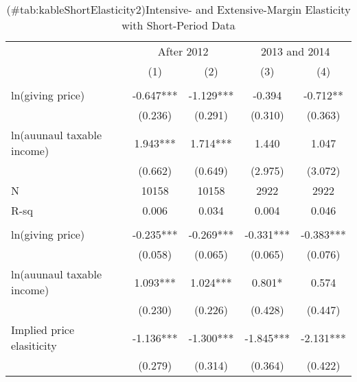 \documentclass[
]{article}
\begin{document}
\begin{table}

\caption{(\#tab:kableShortElasticity2)Intensive- and Extensive-Margin Elasticity with Short-Period Data}
\centering
\fontsize{7}{9}\selectfont
\begin{threeparttable}
\begin{tabular}[t]{lcccc}
\toprule
\multicolumn{1}{c}{ } & \multicolumn{2}{c}{After 2012} & \multicolumn{2}{c}{2013 and 2014} \\
\cmidrule(l{3pt}r{3pt}){2-3} \cmidrule(l{3pt}r{3pt}){4-5}
 & (1) & (2) & (3) & (4)\\
\midrule
\addlinespace[0.3em]
\multicolumn{5}{l}{\textbf{Intensive-Margin Elasticity}}\\
\hspace{1em}ln(giving price) & -0.647*** & -1.129*** & -0.394 & -0.712**\\
\hspace{1em} & (0.236) & (0.291) & (0.310) & (0.363)\\
\hspace{1em}ln(auunaul taxable income) & 1.943*** & 1.714*** & 1.440 & 1.047\\
\hspace{1em} & (0.662) & (0.649) & (2.975) & (3.072)\\
\hspace{1em}N & 10158 & 10158 & 2922 & 2922\\
\hspace{1em}R-sq & 0.006 & 0.034 & 0.004 & 0.046\\
\addlinespace[0.3em]
\multicolumn{5}{l}{\textbf{Extensive-Margin Elasticity}}\\
\hspace{1em}ln(giving price) & -0.235*** & -0.269*** & -0.331*** & -0.383***\\
\hspace{1em} & (0.058) & (0.065) & (0.065) & (0.076)\\
\hspace{1em}ln(auunaul taxable income) & 1.093*** & 1.024*** & 0.801* & 0.574\\
\hspace{1em} & (0.230) & (0.226) & (0.428) & (0.447)\\
\hspace{1em}Implied price elasiticity & -1.136*** & -1.300*** & -1.845*** & -2.131***\\
\hspace{1em} & (0.279) & (0.314) & (0.364) & (0.422)\\

\end{tabular}
\end{threeparttable}
\end{table}
\end{document}
